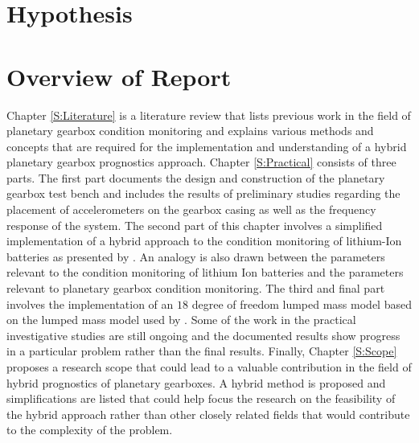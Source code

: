 \section{Hypothesis}

\section{Overview of Report}
Chapter \ref{S:Literature} is a literature review that lists previous work in the field of planetary gearbox condition monitoring and explains various methods and concepts that are required for the implementation and understanding of a hybrid planetary gearbox prognostics approach.
Chapter \ref{S:Practical} consists of three parts. The first part documents the design and construction of the planetary gearbox test bench and includes the results of preliminary studies regarding the placement of accelerometers on the gearbox casing as well as the frequency response of the system. The second part of this chapter involves a simplified implementation of a hybrid approach to the condition monitoring of lithium-Ion batteries as presented by \cite{Liao2016}. An analogy is also drawn between the parameters relevant to the condition monitoring of lithium Ion batteries and the parameters relevant to planetary gearbox condition monitoring. The third and final part involves the implementation of an $18$ degree of freedom lumped mass model based on the lumped mass model used by \cite{Chaari2006}. Some of the work in the practical investigative studies are still ongoing and the documented results show progress in a particular problem rather than the final results. Finally, Chapter \ref{S:Scope} proposes a research scope that could lead to a valuable contribution in the field of hybrid prognostics of planetary gearboxes. A hybrid method is proposed and simplifications are listed that could help focus the research on the feasibility of the hybrid approach rather than other closely related fields that would contribute to the complexity of the problem.



